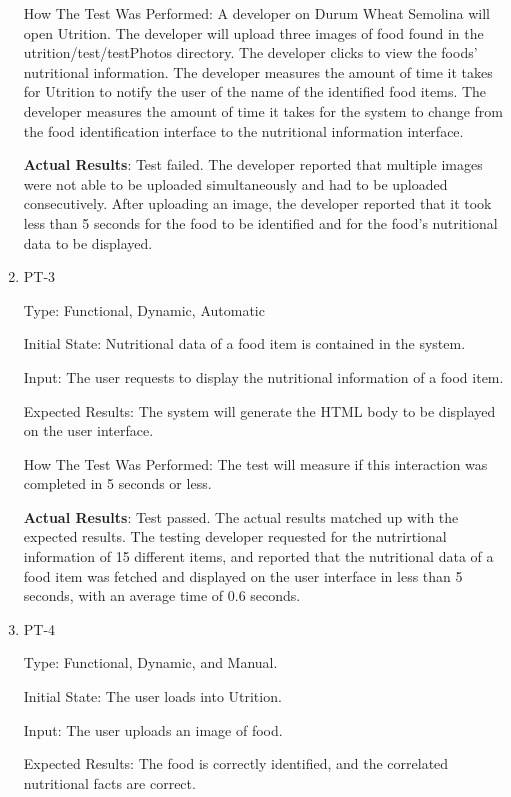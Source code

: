 \documentclass[12pt, titlepage]{article}
\begin{document}
\begin{enumerate}
		How The Test Was Performed: A developer on Durum Wheat Semolina will 
		open Utrition. The developer 
		will upload three images of food found in the utrition/test/testPhotos 
		directory. The developer clicks to view 
		the foods’ nutritional information. The developer measures the amount 
		of time it takes for Utrition to notify the user of the name of the 
		identified food items. The developer measures the amount of time it 
		takes for the system to change from the food identification interface 
		to the nutritional information interface.
		
		\textbf{Actual Results}: Test failed. The developer reported that multiple images were not able to be uploaded simultaneously and had to be uploaded consecutively. After uploading an image, the developer reported that it took less than 5 seconds for the food to be identified and for the food's nutritional data to be displayed.
		
		\item{PT-3}
		
		Type: Functional, Dynamic, Automatic
		
		Initial State: Nutritional data of a food item is contained in the 
		system.
		
		Input: The user requests to display the nutritional information of a 
		food item.
		
		Expected Results: The system will generate the HTML body to be displayed on 
		the user 
		interface.
		
		How The Test Was Performed: The test will measure if this interaction 
		was completed in 5 seconds or less.
		
		\textbf{Actual Results}: Test passed. The actual results matched up with the expected results. The testing developer requested for the nutrirtional information of 15 different items, and reported that the nutritional data of a food item was fetched and displayed on the user interface in less than 5 seconds, with an average time of 0.6 seconds.
		
		\item{PT-4} 
		
		Type: Functional, Dynamic, and Manual.
		
		Initial State: The user loads into Utrition.
		
		Input: The user uploads an image of food.
		
		Expected Results: The food is correctly identified, and the correlated nutritional facts are correct.
		

\end{enumerate}
\end{document}
